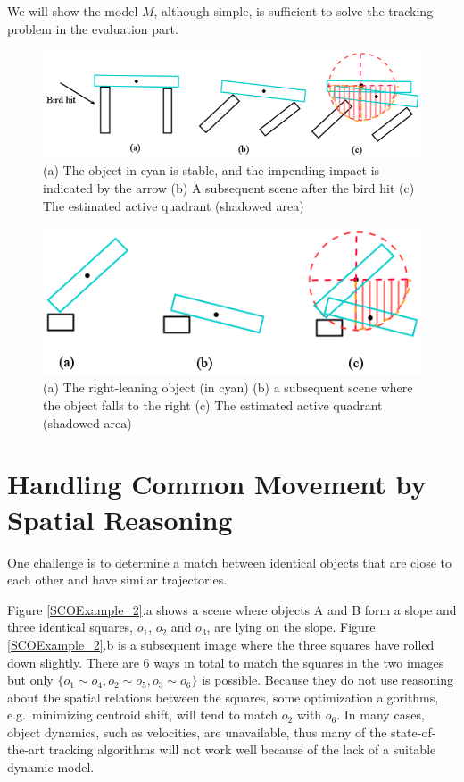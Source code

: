 \documentclass[letterpaper]{article}
\begin{document}
We will show the model $M$, although simple, is sufficient to solve the tracking problem in the evaluation part.  

\begin{figure}[h!]
\centering\includegraphics[scale=0.35]{BirdImpact.png}\caption{(a) The object in cyan is stable, and the impending impact is indicated by the arrow (b) A subsequent scene after the bird hit (c) The estimated active quadrant (shadowed area)}
\label{BirdImpact}
\end{figure}

\begin{figure}[h!]
\centering\includegraphics[scale=0.4]{QudrantsEstimation.png}\caption{(a) The right-leaning object (in cyan)  (b) a subsequent scene where the object falls to the right (c) The estimated active quadrant (shadowed area)}
\label{QudrantsEstimation}
\end{figure}




\section{Handling Common Movement by Spatial Reasoning}
\label{CM}
One challenge is to determine a match between identical objects that are close to each other and have similar trajectories.  

Figure \ref{SCOExample_2}.a  shows a scene where objects A and B form a slope and three identical squares, $o_1$, $o_2$ and $o_3$, are lying on the slope. Figure \ref{SCOExample_2}.b is a subsequent image where the three squares have rolled down slightly. There are 6 ways in total to match the squares in the two images but only $\{o_1 \sim o_4, o_2 \sim o_5, o_3 \sim o_6\}$ is possible. Because they do not use reasoning about the spatial relations between the squares, some optimization algorithms, e.g.\ minimizing centroid shift, will tend to match $o_2$ with $o_6$. In many cases, object dynamics, such as velocities, are unavailable, thus many of the state-of-the-art tracking algorithms will not work well because of the lack of a suitable dynamic model. 
\end{document}
